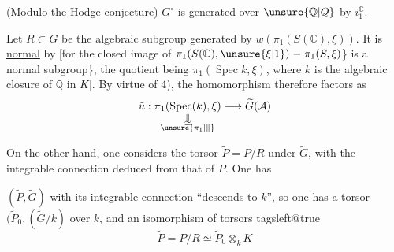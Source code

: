  (Modulo the Hodge conjecture) $G^{\circ}$ is generated over $\unsure{\mathbb Q|Q}$ by $i_1^{\mathbb C}$.


Let $R\subset G$ be the algebraic subgroup generated by $w(\pi_1(S(\mathbb C),\xi))$. It is \uline{normal} by  [for the closed image of $\pi_1(S(\mathbb C),\unsure{\xi|1})\relbar\pi_1(S,\xi)$\} is a normal subgroup\}, the quotient being $\pi_1(\operatorname{Spec} k,\xi)$, where $k$ is the algebraic closure of $\mathbb Q$ in $K$].  By virtue of 4), the homomorphism
therefore factors as
\[
\tilde u:\underset{\substack{\Vert\\[-.4ex]\simeq\\[-.4ex]\unsure{\pi_1|\Vert}}}{\pi_1(\operatorname{Spec}(k),\xi)}
\longrightarrow\widetilde G(\mathcal A)
\]

On the other hand, one considers the torsor $\widetilde P=P/R$ under $\widetilde G$, with the integrable connection deduced from that of $P$. One has

  $(\widetilde P,\widetilde G)$ with its integrable connection ``descends to $k$'', so one has a torsor $(\widetilde P_0,(\widetilde G/k)$ over $k$, and an isomorphism of torsors
\begingroup
\csname tagsleft@true\endcsname
\[
\widetilde P=P/R\simeq\widetilde P_0\otimes_k K \tag*{(*)}
\]
\endgroup

